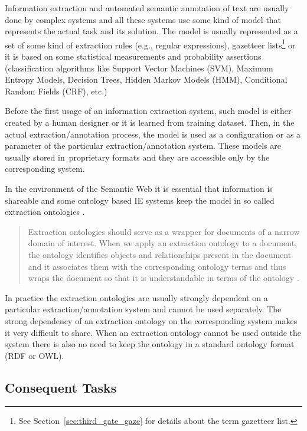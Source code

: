 Information extraction and automated semantic annotation of text are usually done by complex systems and all these systems use some kind of model that represents the actual task and its solution. The model is usually represented as a set of some kind of extraction rules (e.g., regular expressions), gazetteer lists\footnote{See Section~\ref{sec:third_gate_gaze} for details about the term gazetteer list.} or it is based on some statistical measurements and probability assertions (classification algorithms like Support Vector Machines (SVM), Maximum Entropy Models, Decision Trees, Hidden Markov Models (HMM), Conditional Random Fields (CRF), etc.)



Before the first usage of an information extraction system, such model is either created by a human designer or it is learned from training dataset. Then, in the actual extraction/annotation process, the model is used as a configuration or as a parameter of the particular extraction/annotation system. These models are usually stored in~proprietary formats and they are accessible only by the corresponding system.



In the environment of the Semantic Web it is essential that information is shareable and some ontology based IE systems keep the model in so called extraction ontologies \citep{DBLP:conf/er/EmbleyTL02}. 
\begin{quotation}
Extraction ontologies should serve as a wrapper for documents of a narrow domain of interest. When we apply an extraction ontology to a document, the ontology identifies objects and relationships present in the document and it associates them with the corresponding ontology terms and thus wraps the document so that it is understandable in terms of the ontology \citep{DBLP:conf/er/EmbleyTL02}.
\end{quotation}



In practice the extraction ontologies are usually strongly dependent on a particular extraction/annotation system and cannot be used separately. The strong dependency of an extraction ontology on the corresponding system makes it very difficult to share. When an extraction ontology cannot be used outside the system there is also no need to keep the ontology in a standard ontology format (RDF or OWL).



\subsection{Consequent Tasks}

